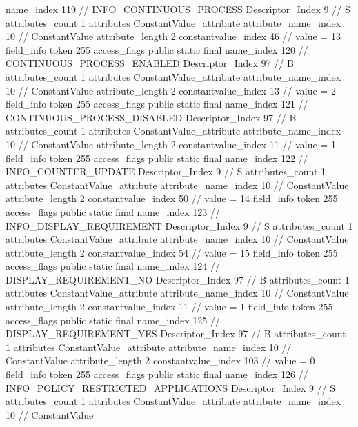 {{{{{				name_index	119		// INFO_CONTINUOUS_PROCESS
				Descriptor_Index	9		// S
				attributes_count	1
				attributes {
				ConstantValue_attribute {
					attribute_name_index	10		// ConstantValue
					attribute_length	2
					constantvalue_index	46		// value = 13
				}
				}
			}
			field_info {
				token	255
				access_flags	public static final
				name_index	120		// CONTINUOUS_PROCESS_ENABLED
				Descriptor_Index	97		// B
				attributes_count	1
				attributes {
				ConstantValue_attribute {
					attribute_name_index	10		// ConstantValue
					attribute_length	2
					constantvalue_index	13		// value = 2
				}
				}
			}
			field_info {
				token	255
				access_flags	public static final
				name_index	121		// CONTINUOUS_PROCESS_DISABLED
				Descriptor_Index	97		// B
				attributes_count	1
				attributes {
				ConstantValue_attribute {
					attribute_name_index	10		// ConstantValue
					attribute_length	2
					constantvalue_index	11		// value = 1
				}
				}
			}
			field_info {
				token	255
				access_flags	public static final
				name_index	122		// INFO_COUNTER_UPDATE
				Descriptor_Index	9		// S
				attributes_count	1
				attributes {
				ConstantValue_attribute {
					attribute_name_index	10		// ConstantValue
					attribute_length	2
					constantvalue_index	50		// value = 14
				}
				}
			}
			field_info {
				token	255
				access_flags	public static final
				name_index	123		// INFO_DISPLAY_REQUIREMENT
				Descriptor_Index	9		// S
				attributes_count	1
				attributes {
				ConstantValue_attribute {
					attribute_name_index	10		// ConstantValue
					attribute_length	2
					constantvalue_index	54		// value = 15
				}
				}
			}
			field_info {
				token	255
				access_flags	public static final
				name_index	124		// DISPLAY_REQUIREMENT_NO
				Descriptor_Index	97		// B
				attributes_count	1
				attributes {
				ConstantValue_attribute {
					attribute_name_index	10		// ConstantValue
					attribute_length	2
					constantvalue_index	11		// value = 1
				}
				}
			}
			field_info {
				token	255
				access_flags	public static final
				name_index	125		// DISPLAY_REQUIREMENT_YES
				Descriptor_Index	97		// B
				attributes_count	1
				attributes {
				ConstantValue_attribute {
					attribute_name_index	10		// ConstantValue
					attribute_length	2
					constantvalue_index	103		// value = 0
				}
				}
			}
			field_info {
				token	255
				access_flags	public static final
				name_index	126		// INFO_POLICY_RESTRICTED_APPLICATIONS
				Descriptor_Index	9		// S
				attributes_count	1
				attributes {
				ConstantValue_attribute {
					attribute_name_index	10		// ConstantValue
}}}}}}}
